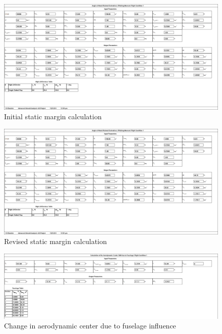 \documentclass[conf]{new-aiaa}
\begin{document}
\begin{figure}[H]
    \includegraphics[width=\textwidth]{Report3Printouts/Stability/CM_alpha.png}
    \caption{Initial static margin calculation}
    \label{fig:cm_alpha}
\end{figure}

\begin{figure}[H]
    \includegraphics[width=\textwidth]{Report3Printouts/Stability/CM_alpha_final.png}
    \caption{Revised static margin calculation}
    \label{fig:cm_alpha_final}
\end{figure}

\begin{figure}[H]
    \includegraphics[width=\textwidth]{Report3Printouts/Stability/delta_x_ac_f_cropped.png}
    \caption{Change in aerodynamic center due to fuselage influence}
    \label{fig:delta_x_ac_f}
\end{figure}
\end{document}
